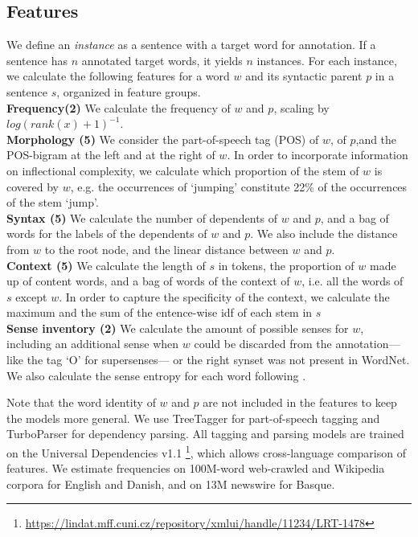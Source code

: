 \documentclass[11pt,a4paper]{article}
\begin{document}
\subsection{Features}
We define an \textit{instance} as a sentence with a target word for annotation. If a sentence has $n$ annotated target words, it yields $n$ instances. For each instance, we calculate the following features for a word $w$ and its syntactic parent $p$ in a sentence $s$, organized in feature groups.\\ 
\noindent\textbf{Frequency(2)} We calculate the frequency of $w$ and $p$, scaling by $log(rank(x)+1)^{-1}$.\\
\textbf{ Morphology (5)} We consider the part-of-speech tag (POS) of $w$, of $p$,and the POS-bigram at the left and at the right of $w$. In order to incorporate information on inflectional complexity, we calculate which proportion of the stem of $w$ is covered by $w$, e.g. the occurrences of `jumping' constitute 22\% of the occurrences of the stem `jump'. \\
\textbf{Syntax (5)} We calculate the number of dependents of $w$ and $p$, and a bag of words for the labels of the dependents of $w$ and $p$. We also include the distance from $w$ to the root node, and the linear distance between $w$ and $p$.\\
\textbf{ Context  (5)} We calculate the length of $s$ in tokens, the proportion of $w$ made up of content words, and a bag of words of the context of $w$, i.e. all the words of $s$ except $w$. In order to capture the specificity of the context, we calculate the maximum and the sum of the entence-wise idf of each stem in $s$ \\
\textbf{Sense inventory (2)} We calculate the amount of possible senses for $w$, including an additional sense when $w$ could be discarded from the annotation---like the tag `O' for supersenses--- or the right synset was not present in WordNet. We also calculate the sense entropy for each word following . 

Note that the word identity of $w$ and $p$ are not included in the features to keep the models more general. We use TreeTagger \cite{Schmid1994} for part-of-speech tagging and TurboParser \cite{Martins2010} for dependency parsing. All tagging and parsing models are trained on the Universal Dependencies v1.1 \footnote{\url{https://lindat.mff.cuni.cz/repository/xmlui/handle/11234/LRT-1478}}, which allows cross-language comparison of features. We estimate frequencies on 100M-word web-crawled and Wikipedia corpora for English and Danish, and on 13M newswire for Basque.
\end{document}
